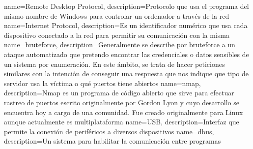 {
	name=Remote Desktop Protocol,
	description={Protocolo que usa el programa del mismo nombre de Windows para controlar un ordenador a través de la red}
}
{
	name=Internet Protocol,
	description={Es un identificador numérico que usa cada dispositivo conectado a la red para permitir su comunicación con la misma}
}
{
	name=bruteforce,
	description={Generalmente se describe por bruteforce a un ataque automatizado que pretendo encontrar las credenciales o datos sensibles de un sistema por enumeración. En este ámbito, se trata de hacer peticiones similares con la intención de conseguir una respuesta que nos indique que tipo de servidor usa la víctima o qué puertos tiene abiertos}
}
{
	name=nmap,
	description={Nmap es un programa de código abierto que sirve para efectuar rastreo de puertos escrito originalmente por Gordon Lyon y cuyo desarrollo se encuentra hoy a cargo de una comunidad. Fue creado originalmente para Linux aunque actualmente es multiplataforma}
}
{
	name=USB,
	description={Interfaz que permite la conexión de periféricos a diversos dispositivos}
}
{
	name=dbus,
	description={Un sistema para habilitar la comunicación entre programas}
}
